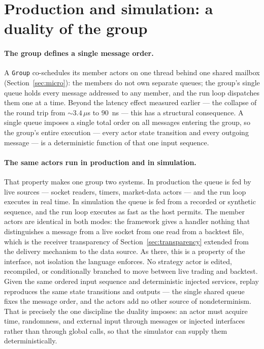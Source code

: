 \documentclass[11pt]{article}
\begin{document}
\section{Production and simulation: a duality of the group}
\label{sec:duality}

\paragraph{The group defines a single message order.} A \texttt{Group}
co-schedules its member actors on one thread behind one shared mailbox
(Section~\ref{sec:micro}): the members do not own separate queues; the group's
single queue holds every message addressed to any member, and the run loop
dispatches them one at a time. Beyond the latency effect measured earlier --- the
collapse of the round trip from $\sim\!3.4\,\mu$s to $90$~ns --- this has a
structural consequence. A single queue imposes a single total order on all
messages entering the group, so the group's entire execution --- every actor
state transition and every outgoing message --- is a deterministic function of
that one input sequence.

\paragraph{The same actors run in production and in simulation.} That property
makes one group two systems. In production the queue is fed by live sources ---
socket readers, timers, market-data actors --- and the run loop executes in real
time. In simulation the queue is fed from a recorded or synthetic sequence, and
the run loop executes as fast as the host permits. The member actors are
identical in both modes: the framework gives a handler nothing that
distinguishes a message from a live socket from one read from a backtest file,
which is the receiver transparency of Section~\ref{sec:transparency} extended
from the delivery mechanism to the data source. As there, this is a property of
the interface, not isolation the language enforces. No strategy actor is edited, recompiled, or
conditionally branched to move between live trading and backtest. Given the same
ordered input sequence and deterministic injected services, replay reproduces the
same state transitions and outputs --- the single shared queue fixes the message
order, and the actors add no other source of nondeterminism. That is precisely
the one discipline the duality imposes: an actor must acquire time, randomness,
and external input through messages or injected interfaces rather than through
global calls, so that the simulator can supply them deterministically.
\end{document}
